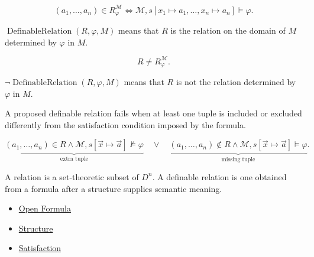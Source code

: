 \begin{remark*}
\[
(a_1,\ldots,a_n)\in R_{\varphi}^{\mathcal M}
\Longleftrightarrow
\mathcal M,s[x_1\mapsto a_1,\ldots,x_n\mapsto a_n]\models\varphi.
\]
\end{remark*}

\begin{remark*}
\(\operatorname{DefinableRelation}(R,\varphi,M)\) means that \(R\) is the
relation on the domain of \(M\) determined by \(\varphi\) in \(M\).
\end{remark*}

\begin{remark*}
\[
R\neq R_{\varphi}^{\mathcal M}.
\]
\end{remark*}

\begin{remark*}
\(\neg\operatorname{DefinableRelation}(R,\varphi,M)\) means that \(R\) is not
the relation determined by \(\varphi\) in \(M\).
\end{remark*}

\begin{remark*}
A proposed definable relation fails when at least one tuple is included or
excluded differently from the satisfaction condition imposed by the formula.
\end{remark*}

\begin{remark*}
\[
\underbrace{(a_1,\ldots,a_n)\in R \land
\mathcal M,s[\vec x\mapsto\vec a]\not\models\varphi}_{\text{extra tuple}}
\quad\lor\quad
\underbrace{(a_1,\ldots,a_n)\notin R \land
\mathcal M,s[\vec x\mapsto\vec a]\models\varphi}_{\text{missing tuple}}.
\]
\end{remark*}

\begin{remark*}[Interpretation]
A relation is a set-theoretic subset of \(D^n\). A definable relation is one
obtained from a formula after a structure supplies semantic meaning.
\end{remark*}

\begin{dependencies}
\begin{itemize}
  \item \hyperref[def:predicate]{Open Formula}
  \item \hyperref[def:structure]{Structure}
  \item \hyperref[def:fol-satisfaction]{Satisfaction}
\end{itemize}
\end{dependencies}

